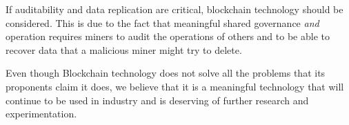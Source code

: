 If auditability and data replication are critical, blockchain technology should be considered. This is due to the fact that meaningful shared governance \emph{and} operation requires miners to audit the operations of others and to be able to recover data that a malicious miner might try to delete.

Even though Blockchain technology does not solve all the problems that its proponents claim it does, we believe that it is a meaningful technology that will continue to be used in industry and is deserving of further research and experimentation.

